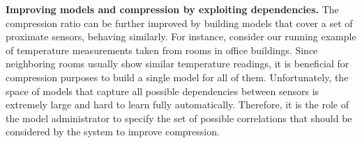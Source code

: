 {\bf Improving models and compression by exploiting dependencies.}
The compression ratio can be further improved by building models that cover a set of proximate sensors, behaving similarly. For instance, consider our running example of temperature measurements taken from rooms in office buildings. Since neighboring rooms usually show similar temperature readings, it is beneficial for compression purposes to build a single model for all of them. Unfortunately, the space of models that capture all possible dependencies between sensors is extremely large and hard to learn fully automatically. Therefore, it is the role of the model administrator to specify the set of possible correlations that should be considered by the system to improve compression.\\






